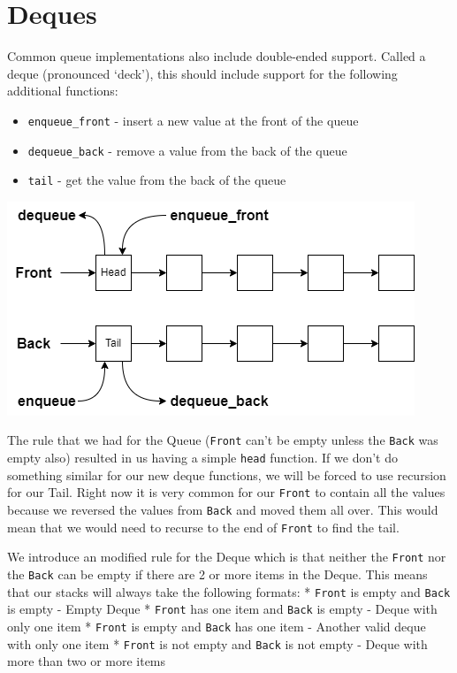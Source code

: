 \documentclass[
]{book}
\providecommand{\tightlist}{%
  \setlength{\itemsep}{0pt}\setlength{\parskip}{0pt}}
\begin{document}
\hypertarget{deques}{%
\section{Deques}\label{deques}}

Common queue implementations also include double-ended support. Called a deque (pronounced `deck'), this should include support for the following additional functions:

\begin{itemize}
\tightlist
\item
  \texttt{enqueue\_front} - insert a new value at the front of the queue
\item
  \texttt{dequeue\_back} - remove a value from the back of the queue
\item
  \texttt{tail} - get the value from the back of the queue
\end{itemize}

\includegraphics{images/deque.drawio.png}

The rule that we had for the Queue (\texttt{Front} can't be empty unless the \texttt{Back} was empty also) resulted in us having a simple \texttt{head} function. If we don't do something similar for our new deque functions, we will be forced to use recursion for our Tail. Right now it is very common for our \texttt{Front} to contain all the values because we reversed the values from \texttt{Back} and moved them all over. This would mean that we would need to recurse to the end of \texttt{Front} to find the tail.

We introduce an modified rule for the Deque which is that neither the \texttt{Front} nor the \texttt{Back} can be empty if there are 2 or more items in the Deque. This means that our stacks will always take the following formats:
* \texttt{Front} is empty and \texttt{Back} is empty - Empty Deque
* \texttt{Front} has one item and \texttt{Back} is empty - Deque with only one item
* \texttt{Front} is empty and \texttt{Back} has one item - Another valid deque with only one item
* \texttt{Front} is not empty and \texttt{Back} is not empty - Deque with more than two or more items
\end{document}
